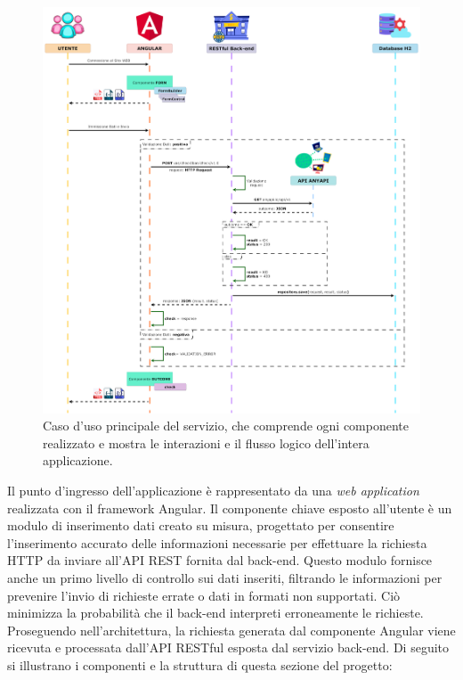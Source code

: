 \begin{figure}[H]
  \centering
  \includegraphics[width=1\textwidth]{img/Architettura.png}
  \caption{Caso d’uso principale del servizio, che comprende ogni componente realizzato e mostra le interazioni e il flusso logico dell’intera applicazione.} 
  \label{fig:Architettura.png}
\end{figure}
Il punto d’ingresso dell’applicazione è rappresentato da una \textit{web application} realizzata con il framework Angular. Il componente chiave esposto all’utente è un modulo di inserimento dati creato su misura, progettato per consentire l’inserimento accurato delle informazioni necessarie per effettuare la richiesta HTTP da inviare all’API REST fornita dal back-end. Questo modulo fornisce anche un primo livello di controllo sui dati inseriti, filtrando le informazioni per prevenire l’invio di richieste errate o dati in formati non supportati. Ciò minimizza la probabilità che il back-end interpreti erroneamente le richieste.\\
Proseguendo nell’architettura, la richiesta generata dal componente Angular viene ricevuta e processata dall’API RESTful esposta dal servizio back-end. Di seguito si illustrano i componenti e la struttura di questa sezione del progetto:

